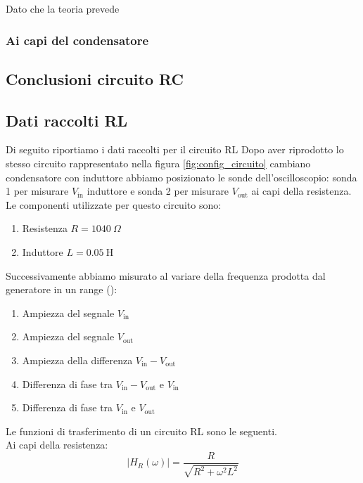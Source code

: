 \documentclass[letterpaper,12pt]{article}
\begin{document}

Dato che la teoria prevede 


\subsubsection{Ai capi del condensatore}


\subsection{Conclusioni circuito RC}


\subsection{Dati raccolti RL}
Di seguito riportiamo i dati raccolti per il circuito RL Dopo aver riprodotto lo stesso circuito rappresentato nella figura \ref{fig:config_circuito} cambiano condensatore con induttore abbiamo posizionato le sonde dell'oscilloscopio: sonda 1 per misurare $V_\text{in}$ induttore e sonda 2 per misurare $V_\text{out}$ ai capi della resistenza. Le componenti utilizzate per questo circuito sono:

\begin{enumerate}
    \item Resistenza $R = 1040\ \Omega$
    \item Induttore $L = 0.05\ \text{H}$
\end{enumerate}

Successivamente abbiamo misurato al variare della frequenza prodotta dal generatore in un range ():
\begin{enumerate}
    \item Ampiezza del segnale $V_\text{in}$
    \item Ampiezza del segnale $V_\text{out}$
    \item Ampiezza della differenza $V_\text{in} - V_\text{out}$
    \item Differenza di fase tra $V_\text{in} - V_\text{out}$ e $V_\text{in}$
    \item Differenza di fase tra $V_\text{in}$ e $V_\text{out}$
\end{enumerate}

Le funzioni di trasferimento di un circuito RL sono le seguenti. \\
Ai capi della resistenza:
\begin{equation}
    \label{eq:Modulo RL (resistenza)}
    |H_R(\omega)| = \frac{R}{\sqrt{R^2 + \omega^2L^2}}
\end{equation}
\end{document}
